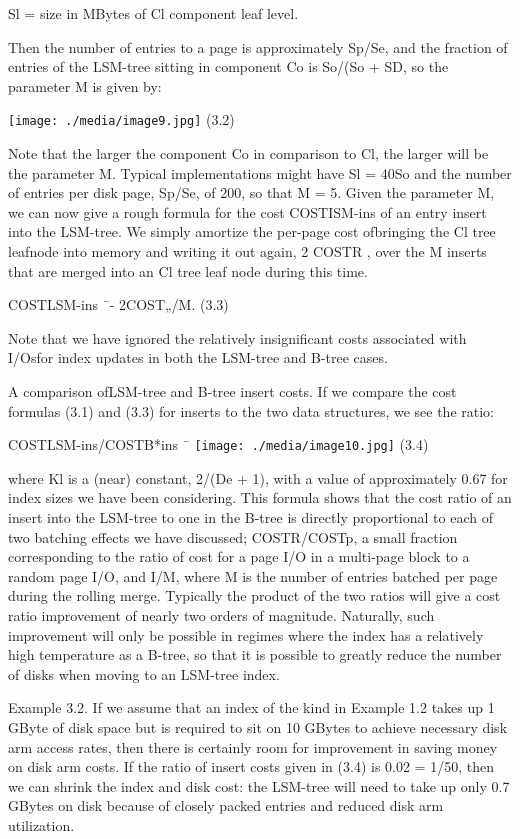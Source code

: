 \documentclass[a4paper,11pt,notitlepage,twoside,openright]{article}
\begin{document}
Sl = size in MBytes of Cl component leaf level.

Then the number of entries to a page is approximately Sp/Se, and the
fraction of entries of the LSM-tree sitting in component Co is So/(So +
SD, so the parameter M is given by:


\texttt{[image: ./media/image9.jpg]}
(3.2)


Note that the larger the component Co in comparison to Cl, the larger
will be the parameter M. Typical implementations might have Sl = 40So
and the number of entries per disk page, Sp/Se, of 200, so that M = 5.
Given the parameter M, we can now give a rough formula for the cost
COSTISM-ins of an entry insert into the LSM-tree. We simply amortize the
per-page cost ofbringing the Cl tree leafnode into memory and writing it
out again, 2 COSTR , over the M inserts that are merged into an Cl tree
leaf node during this time.


COSTLSM-ins ¯- 2COST„/M. (3.3)


Note that we have ignored the relatively insignificant costs associated
with I/Osfor index updates in both the LSM-tree and B-tree cases.

A comparison ofLSM-tree and B-tree insert costs. If we compare the cost
formulas (3.1) and (3.3) for inserts to the two data structures, we see
the ratio:


COSTLSM-ins/COSTB*ins ¯
\texttt{[image: ./media/image10.jpg]}
(3.4)


where Kl is a (near) constant, 2/(De + 1), with a value of approximately
0.67 for index sizes we have been considering. This formula shows that
the cost ratio of an insert into the LSM-tree to one in the B-tree is
directly proportional to each of two batching effects we have discussed;
COSTR/COSTp, a small fraction corresponding to the ratio of cost for a
page I/O in a multi-page block to a random page I/O, and I/M, where M is
the number of entries batched per page during the rolling merge.
Typically the product of the two ratios will give a cost ratio
improvement of nearly two orders of magnitude. Naturally, such
improvement will only be possible in regimes where the index has a
relatively high temperature as a B-tree, so that it is possible to
greatly reduce the number of disks when moving to an LSM-tree index.

Example 3.2. If we assume that an index of the kind in Example 1.2 takes
up 1 GByte of disk space but is required to sit on 10 GBytes to achieve
necessary disk arm access rates, then there is certainly room for
improvement in saving money on disk arm costs. If the ratio of insert
costs given in (3.4) is 0.02 = 1/50, then we can shrink the index and
disk cost: the LSM-tree will need to take up only 0.7 GBytes on disk
because of closely packed entries and reduced disk arm utilization.
\end{document}
